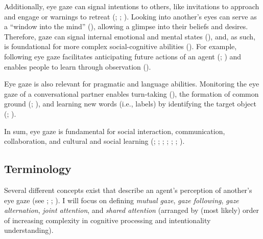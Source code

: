 \documentclass[
]{scrbook}
\begin{document}
Additionally, eye gaze can signal intentions to others, like invitations to approach and engage or warnings to retreat (; ; ). Looking into another's eyes can serve as a ``window into the mind'' (), allowing a glimpse into their beliefs and desires. Therefore, gaze can signal internal emotional and mental states (), and, as such, is foundational for more complex social-cognitive abilities (). For example, following eye gaze facilitates anticipating future actions of an agent (; ) and enables people to learn through observation ().

Eye gaze is also relevant for pragmatic and language abilities. Monitoring the eye gaze of a conversational partner enables turn-taking (), the formation of common ground (; ), and learning new words (i.e., labels) by identifying the target object (; ).

In sum, eye gaze is fundamental for social interaction, communication, collaboration, and cultural and social learning (; ; ; ; ; ; ).

\subsection{Terminology}\label{terminology-1}

Several different concepts exist that describe an agent's perception of another's eye gaze (see ; ; ). I will focus on defining \emph{mutual gaze}, \emph{gaze following}, \emph{gaze alternation}, \emph{joint attention}, and \emph{shared attention} (arranged by (most likely) order of increasing complexity in cognitive processing and intentionality understanding).
\end{document}
